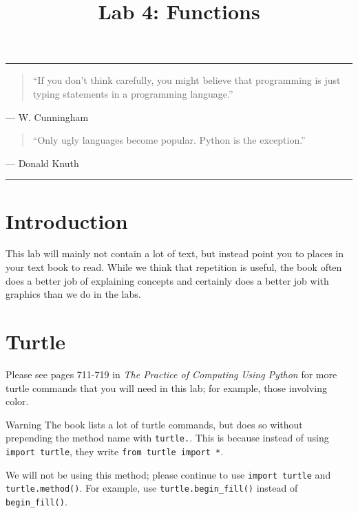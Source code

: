 \documentclass[11pt]{cselabheader}
\title{Lab 4: Functions}
\begin{document}
\maketitle

\hrule
\begin{quotation}
``If you don't think carefully, you might believe that programming is just
typing statements in a programming language.''
\end{quotation}
\begin{flushright}
--- W. Cunningham
\end{flushright}

\begin{quotation}
``Only ugly languages become popular. Python is the exception.''
\end{quotation}
\begin{flushright}
--- Donald Knuth
\end{flushright}

\hrule

\section{Introduction}

This lab will mainly not contain a lot of text, but instead point you to places
in your text book to read. While we think that repetition is useful, the book
often does a better job of explaining concepts and certainly does a better job
with graphics than we do in the labs. 

\section{Turtle}

Please see pages 711-719 in \emph{The Practice of Computing Using Python} for
more turtle commands that you will need in this lab; for example, those
involving color.

\begin{warningbox}{Warning}
  The book lists a lot of turtle commands, but does so without prepending the
  method name with \lstinline!turtle.!. This is because instead of using
  \lstinline!import turtle!, they write \lstinline!from turtle import *!. 

  We will not be using this method; please continue to use 
  \lstinline!import turtle! and \lstinline!turtle.method()!. For example, use 
  \lstinline!turtle.begin_fill()! instead of \lstinline!begin_fill()!.
\end{warningbox}
\end{document}
